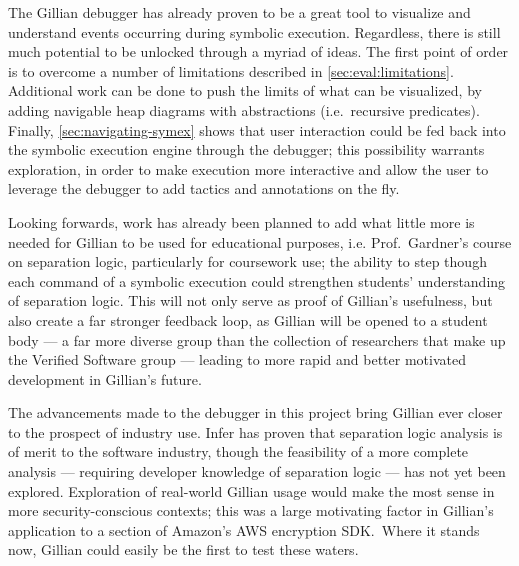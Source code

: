 
The Gillian debugger has already proven to be a great tool to visualize and
understand events occurring during symbolic execution. Regardless, there is
still much potential to be unlocked through a myriad of ideas.
The first point of order is to overcome a number of limitations described in
\autoref{sec:eval:limitations}. Additional work can be done to push the limits
of what can be visualized, by adding navigable heap diagrams with abstractions
(i.e.\ recursive predicates). Finally, \autoref{sec:navigating-symex} shows that
user interaction could be fed back into the symbolic execution engine through
the debugger; this possibility warrants exploration, in order to make execution
more interactive and allow the user to leverage the debugger to add tactics and
annotations on the fly.

Looking forwards, work has already been planned to add what little more is
needed for Gillian to be used for educational purposes, i.e. Prof.\ Gardner's
course on separation logic, particularly for coursework use; the ability to step
though each command of a symbolic execution could strengthen students'
understanding of separation logic. This will not only serve as proof of
Gillian's usefulness, but also create a far stronger feedback loop, as Gillian
will be opened to a student body --- a far more diverse group than the
collection of researchers that make up the Verified Software group --- leading
to more rapid and better motivated development in Gillian's future.

The advancements made to the debugger in this project bring Gillian ever closer
to the prospect of industry use. Infer has proven that separation logic analysis
is of merit to the software industry, though the feasibility of a more complete
analysis --- requiring developer knowledge of separation logic --- has not yet
been explored. Exploration of real-world Gillian usage would make the most sense
in more security-conscious contexts; this was a large motivating factor in
Gillian's application to a section of Amazon's AWS encryption SDK.\ Where it
stands now, Gillian could easily be the first to test these waters. 

